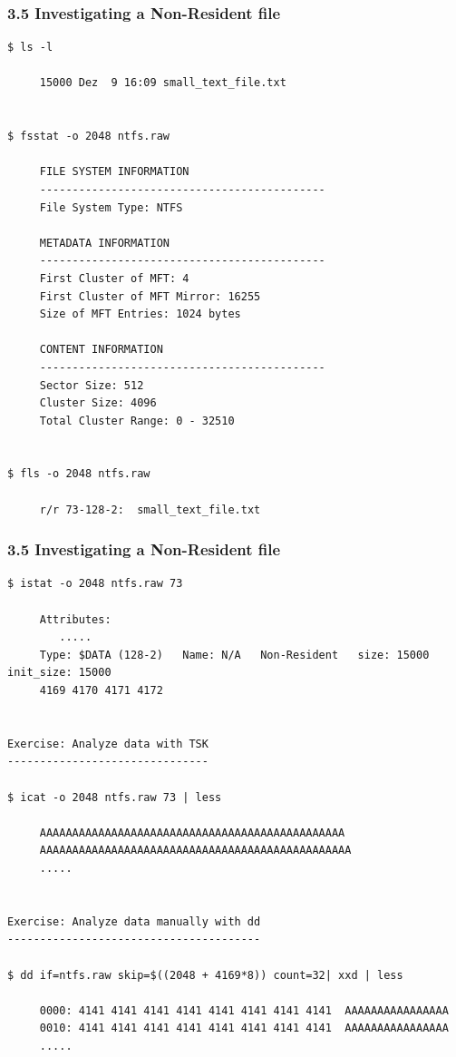 \begin{frame}[fragile]
  \frametitle{3.5 Investigating a Non-Resident file}
  \begin{lstlisting}[basicstyle=\tiny]
$ ls -l

     15000 Dez  9 16:09 small_text_file.txt


$ fsstat -o 2048 ntfs.raw

     FILE SYSTEM INFORMATION
     --------------------------------------------
     File System Type: NTFS

     METADATA INFORMATION
     --------------------------------------------
     First Cluster of MFT: 4
     First Cluster of MFT Mirror: 16255
     Size of MFT Entries: 1024 bytes

     CONTENT INFORMATION
     --------------------------------------------
     Sector Size: 512
     Cluster Size: 4096
     Total Cluster Range: 0 - 32510

  
$ fls -o 2048 ntfs.raw

     r/r 73-128-2:	small_text_file.txt
  \end{lstlisting}
\end{frame}


\begin{frame}[fragile]
  \frametitle{3.5 Investigating a Non-Resident file}
  \begin{lstlisting}[basicstyle=\tiny]
$ istat -o 2048 ntfs.raw 73

     Attributes: 
        .....
     Type: $DATA (128-2)   Name: N/A   Non-Resident   size: 15000  init_size: 15000
     4169 4170 4171 4172


Exercise: Analyze data with TSK
-------------------------------

$ icat -o 2048 ntfs.raw 73 | less

     AAAAAAAAAAAAAAAAAAAAAAAAAAAAAAAAAAAAAAAAAAAAAAA
     AAAAAAAAAAAAAAAAAAAAAAAAAAAAAAAAAAAAAAAAAAAAAAAA
     .....


Exercise: Analyze data manually with dd
---------------------------------------

$ dd if=ntfs.raw skip=$((2048 + 4169*8)) count=32| xxd | less

     0000: 4141 4141 4141 4141 4141 4141 4141 4141  AAAAAAAAAAAAAAAA
     0010: 4141 4141 4141 4141 4141 4141 4141 4141  AAAAAAAAAAAAAAAA
     .....
  \end{lstlisting}
\end{frame}


